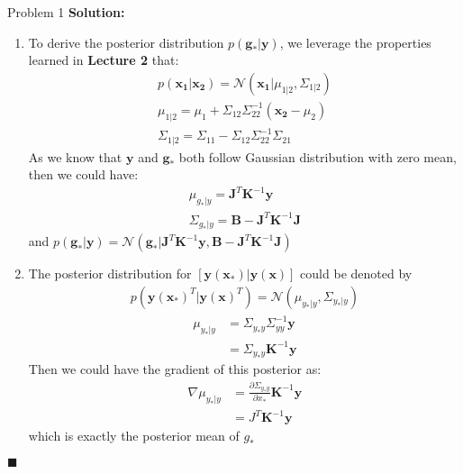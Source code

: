 \documentclass{article}
\newenvironment{solution}                               %
{\textbf{Solution:} }{$\blacksquare$}                   %
\newcommand{\Gaussian}{\mathcal{N}}                     %
\renewcommand{\vec}[1]{\mathbf{#1}}                     %
\begin{document}
\begin{section}{Problem 1}
\begin{solution}
\begin{enumerate}[label=\alph*)]
                \item %
                To derive the posterior distribution $p(\vec{g_*} | \vec{y})$, we leverage the properties learned in \textbf{Lecture 2} that:
                \begin{gather*}
                    p(\vec{x_1} | \vec{x_2}) = \Gaussian(\vec{x_1} | \mu_{1|2}, \Sigma_{1|2}) \\
                    \mu_{1|2} = \mu_1 + \Sigma_{12} \Sigma_{22}^{-1}(\vec{x_2} - \mu_2) \\
                    \Sigma_{1|2} = \Sigma_{11} - \Sigma_{12} \Sigma_{22}^{-1} \Sigma_{21}
                \end{gather*}
                As we know that $\vec{y}$ and $\vec{g_*}$ both follow Gaussian distribution with zero mean, then we could have:
                \begin{gather*}
                    \mu_{g_*|y} = \vec{J}^T \vec{K}^{-1} \vec{y} \\
                    \Sigma_{g_*|y} = \vec{B} - \vec{J}^T \vec{K}^{-1} \vec{J}
                \end{gather*}
                and $p(\vec{g_*} | \vec{y}) = \Gaussian(\vec{g_*} | \vec{J}^T \vec{K}^{-1} \vec{y}, \vec{B} - \vec{J}^T \vec{K}^{-1} \vec{J})$

                \item %
                The posterior distribution for $[\vec{y(x_*)} | \vec{y(x)}]$ could be denoted by
                \begin{gather*}
                    p(\vec{y(x_*)}^T | \vec{y(x)}^T) = \Gaussian(\mu_{y_*|y}, \Sigma_{y_*|y})
                \end{gather*}
                \begin{align*}
                    \mu_{y_*|y} &= \Sigma_{y_* y} \Sigma_{y y}^{-1} \vec{y} \\
                    &= \Sigma_{y_* y} \vec{K}^{-1} \vec{y}
                \end{align*}
                Then we could have the gradient of this posterior as:
                \begin{align*}
                    \nabla \mu_{y_*|y} &= \frac{\partial \Sigma_{y_* y}}{\partial x_*} \vec{K}^{-1} \vec{y} \\
                    &= J^T \vec{K}^{-1} \vec{y}
                \end{align*}
                which is exactly the posterior mean of $g_*$
                

\end{enumerate}
\end{solution}
\end{section}
\end{document}

